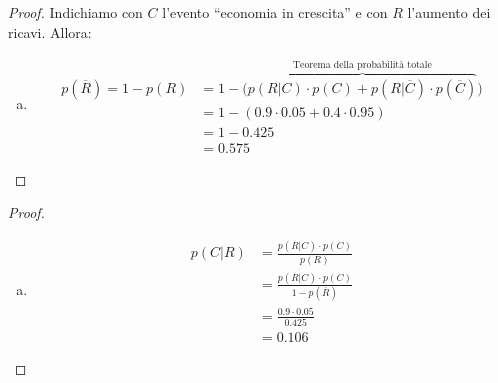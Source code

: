 \documentclass{beamer}
\begin{document}
\begin{frame}[fragile]
	\begin{proof}\renewcommand{\qedsymbol}{$\square$}
		Indichiamo con $C$ l'evento ``economia in crescita'' e con $R$ l'aumento dei ricavi. Allora:
		\begin{enumerate}[(a)]
			\item \begin{align*}
				      p(\overline R) = 1 - p(R) & = 1 - \big( \overbrace{p(R|C) \cdot p(C) + p(R|\overline C) \cdot p(\overline C)}^{\text{Teorema della probabilità totale}} \big) \\
				      & = 1 - (0.9 \cdot 0.05 + 0.4 \cdot 0.95 ) \\
				      & = 1 - 0.425 \\
				      & = 0.575
			      \end{align*}
		\end{enumerate}
	\end{proof}
\end{frame}

\begin{frame}[fragile]
	\begin{proof}%
		\begin{enumerate}[(b)]
			\item \begin{align*}
				      p(C|R) & = \frac{p(R|C)\cdot p(C)}{p(R)} \\
				      & = \frac{p(R|C) \cdot p(C)}{1 - p(\overline R)} \\ %
				      & = \frac{0.9\cdot 0.05}{0.425} \\
				      & = 0.106
			      \end{align*}
		\end{enumerate}

	\end{proof}
\end{frame}
\end{document}
